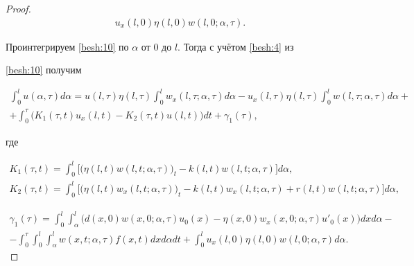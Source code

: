 \begin{proof}
\begin{multline}
u_{x}(l, 0)\eta(l, 0)w(l, 0;\alpha,\tau).

\label{besh:10}

\end{multline}

Проинтегрируем \eqref{besh:10} по $\alpha$ от 0 до $l$. Тогда с учётом \eqref{besh:4} из

\eqref{besh:10} получим

\begin{multline}

\int^{l}_{0}u(\alpha,\tau)d\alpha =

u(l,\tau)\eta(l,\tau)\int^{l}_{0}w_{x}(l,\tau;\alpha,\tau)d\alpha

-u_{x}(l,\tau)\eta(l,\tau)\int^{l}_{0}w(l,\tau;\alpha,\tau)d\alpha+

\\

+\int^{\tau}_0\Big(

K_{1}(\tau,t)u_{x}(l,t)-K_{2}(\tau,t)u(l,t)\Big)dt+\gamma_{1}(\tau),

\label{besh:11}

\end{multline}

где

\begin{gather*}

K_{1}(\tau,t)=\int^{l}_{0}\big[\big(\eta(l,t)w(l,t;\alpha,\tau)\big)_{t}

-k(l,t)w(l,t;\alpha,\tau)\big]d\alpha,

\\

K_{2}(\tau,t)=\int^{l}_{0}\Big[\big(\eta(l,t)w_{x}(l,t;\alpha,\tau)\big)_{t}-

k(l,t)w_{x}(l,t;\alpha,\tau)+r(l,t)w(l,t;\alpha,\tau)\Big]d\alpha,

\end{gather*}

\begin{multline*}

\gamma_{1}(\tau) =\int^{l}_{0}\int^{l}_\alpha\Big(d(x, 0)

w(x, 0;\alpha,\tau)u_{0}(x)-\eta(x, 0)w_{x}(x, 0;\alpha,\tau)u'_{0}(x)

\Big)dxd\alpha-

\\

-\int^{\tau}_0 \int^{l}_{0}

\int^l_{\alpha}w(x,t;\alpha,\tau)f(x,t)dxd\alpha dt+

\int^{l}_{0}u_{x}(l, 0)\eta(l, 0)w(l, 0;\alpha,\tau)d\alpha.


\end{multline*}
\end{proof}
